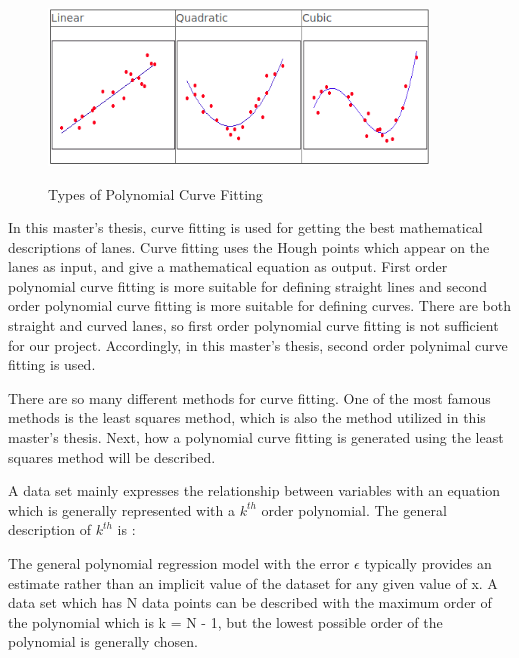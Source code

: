 \begin{figure}[H]
 \centering
  \includegraphics[width=0.9\textwidth]{./Bilder/Curve_Fitting_Polynomial.png}\label{Curve_Fitting_Polynomial}
  \caption{Types of Polynomial Curve Fitting\cite{Curve_Fitting_Polynomial}}
\end{figure}


In this master's thesis, curve fitting is used for getting the best mathematical descriptions of lanes. Curve fitting uses the Hough points which appear on the lanes as input, and give a mathematical equation as output. First order polynomial curve fitting is more suitable for defining straight lines and second order polynomial curve fitting is more suitable for defining curves. There are both straight and curved lanes, so first order polynomial curve fitting is not sufficient for our project. Accordingly, in this master's thesis, second order polynimal curve fitting is used.

There are so many different methods for curve fitting. One of the most famous methods is the least squares method, which is also the method utilized in this master's thesis. Next, how a polynomial curve fitting is generated using the least squares method will be described.

A data set mainly expresses the relationship between variables with an equation which is generally represented with a $k^{th}$ order polynomial. The general description of $ k^{th} $ is :

\begin{center}
\end{center}

The general polynomial regression model with the error $\epsilon$ typically provides an estimate rather than an implicit value of the dataset for any given value of x. A data set which has N data points can be described with the maximum order of the polynomial which is k = N - 1, but the lowest possible order of the polynomial is generally chosen.

